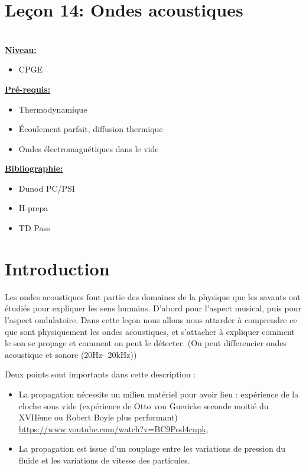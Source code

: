 \documentclass[french, a4paper, 10pt, twocolumn, landscape]{article}
\begin{document}
\section*{Leçon 14: Ondes acoustiques}

\hrulefill\\

\noindent\underline{\textbf{Niveau:}}
\begin{itemize}
  \item CPGE 
\end{itemize}
\underline{\textbf{Pr{\'e}-requis: }}

\begin{itemize}  
\item Thermodynamique
\item Écoulement parfait, diffusion thermique
\item Ondes électromagnétiques dans le vide
\end{itemize}
\underline{\textbf{Bibliographie:}}

\begin{itemize}
  \item Dunod PC/PSI
  \item H-prepa
  \item TD Pass
\end{itemize}
\hrulefill


\section*{Introduction}

Les ondes acoustiques font partie des domaines de la physique que les savants ont étudiés pour expliquer les sens humains. D'abord pour l'aspect musical, puis pour l'aspect ondulatoire. Dans cette leçon nous allons nous attarder à comprendre ce que sont physiquement les ondes acoustiques, et s'attacher à expliquer comment le son se propage et comment on peut le détecter. (On peut differencier ondes acoustique et sonore (20Hz- 20kHz))

Deux points sont importants dans cette description :
  \begin{itemize}
      \item La propagation nécessite un milieu matériel pour avoir lieu : expérience de la cloche sous vide (expérience de Otto von Guericke seconde moitié du XVIIème ou Robert Boyle plus performant) \url{https://www.youtube.com/watch?v=BC9Pod4cnpk},
      \item La propagation est issue d'un couplage entre les variations de pression du fluide et les variations de vitesse des particules.
  \end{itemize}
\end{document}
